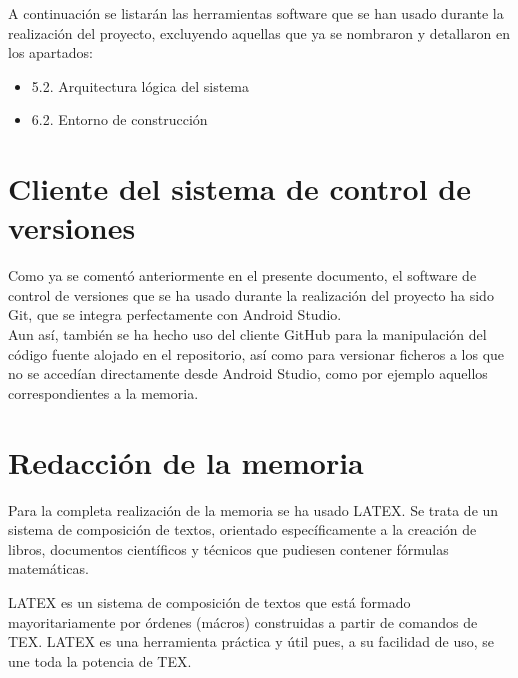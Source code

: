 

A continuación se listarán las herramientas software que se han usado durante la realización del proyecto, excluyendo aquellas que ya se nombraron y detallaron en los apartados:

\begin{itemize}
\item 5.2. Arquitectura lógica del sistema
\item 6.2. Entorno de construcción
\end{itemize}

\section{Cliente del sistema de control de versiones}

Como ya se comentó anteriormente en el presente documento, el software de control de versiones que se ha usado durante la realización del proyecto ha sido Git, que se integra perfectamente con Android Studio.\\

Aun así, también se ha hecho uso del cliente GitHub para la manipulación del código fuente alojado en el repositorio, así como para versionar ficheros a los que no se accedían directamente desde Android Studio, como por ejemplo aquellos correspondientes a la memoria.


\section{Redacción de la memoria}

Para la completa realización de la memoria se ha usado LATEX. Se trata de un sistema de composición de textos, orientado específicamente a la creación de libros, documentos científicos y técnicos que pudiesen contener fórmulas matemáticas.\\


LATEX es un sistema de composición de textos que está formado mayoritariamente por órdenes (mácros) construidas a partir de comandos de TEX. LATEX es una herramienta práctica y útil pues, a su facilidad de uso, se une toda la potencia de TEX.

